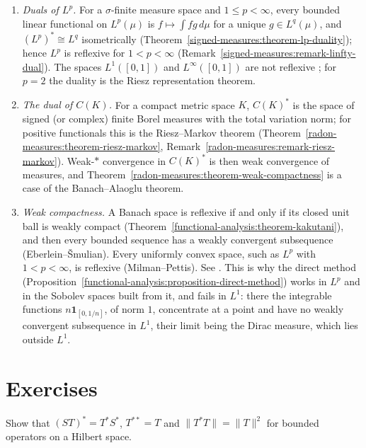 \begin{remark}\label{functional-analysis:remark-reflexive}
\begin{enumerate}
\item \emph{Duals of $L^p$.} For a $\sigma$-finite measure space and $1 \leq p < \infty$, every bounded linear functional on $L^p(\mu)$ is $f \mapsto \int fg\,d\mu$ for a unique $g \in L^q(\mu)$, and
$(L^p)^* \cong L^q$ isometrically (Theorem~\ref{signed-measures:theorem-lp-duality}); hence $L^p$ is reflexive for $1 < p < \infty$ (Remark~\ref{signed-measures:remark-linfty-dual}). The spaces
$L^1([0, 1])$ and $L^\infty([0, 1])$ are not reflexive \cite[Chapter 4]{brezis-functional}; for $p = 2$ the duality is the Riesz representation theorem.
\item \emph{The dual of $C(K)$.} For a compact metric space $K$, $C(K)^*$ is the space of signed (or complex) finite Borel measures with the total variation norm; for positive functionals this is the
Riesz--Markov theorem (Theorem~\ref{radon-measures:theorem-riesz-markov}, Remark~\ref{radon-measures:remark-riesz-markov}). Weak-$*$ convergence in $C(K)^*$ is then weak convergence of measures, and
Theorem~\ref{radon-measures:theorem-weak-compactness} is a case of the Banach--Alaoglu theorem.
\item \emph{Weak compactness.} A Banach space is reflexive if and only if its closed unit ball is weakly compact (Theorem~\ref{functional-analysis:theorem-kakutani}), and then every bounded sequence has a weakly convergent subsequence
(Eberlein--\v{S}mulian). Every uniformly convex space, such as $L^p$ with $1 < p < \infty$, is reflexive (Milman--Pettis). See \cite[Chapter 3]{brezis-functional}. This is why the direct method
(Proposition~\ref{functional-analysis:proposition-direct-method}) works in $L^p$ and in the Sobolev spaces built from it, and fails in $L^1$: there the integrable functions $n\mathbf{1}_{[0, 1/n]}$, of norm $1$,
concentrate at a point and have no weakly convergent subsequence in $L^1$, their limit being the Dirac measure, which lies outside $L^1$.
\end{enumerate}
\end{remark}

\section{Exercises}\label{functional-analysis:section-exercises}

\begin{exercise}\label{functional-analysis:exercise-adjoint-properties}
Show that $(ST)^* = T^*S^*$, $T^{**} = T$ and $\|T^*T\| = \|T\|^2$ for bounded operators on a Hilbert space.
\end{exercise}

